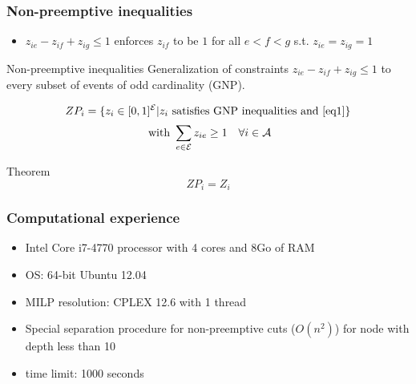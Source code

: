 \begin{frame}
  \frametitle{Non-preemptive inequalities}

  \begin{itemize}
  \item $ z_{ie}-z_{if}+z_{ig} \le 1$ enforces
    $z_{if}$ to be $1$ for all $e<f<g$ s.t. $z_{ie}=z_{ig}=1$ 
  \end{itemize}
  \pause
  \vspace{0.4cm}
  \begin{block}{Non-preemptive inequalities }
    Generalization of constraints $ z_{ie}-z_{if}+z_{ig} \le 1$ to
    every subset of events of odd cardinality (GNP).
  \end{block}
  \pause
  \vspace{0.4cm}
  \[ZP_i=\{ z_i \in [0,1]^{\cal E} | z_i\text{ satisfies
      GNP inequalities and } \eqref{eq1}\}\] 
  \begin{equation}
    \text{ with }  \sum_{e \in \cal E} z_{ie} \ge 1 \quad \forall i \in \cal A  
    \label{eq1}  
  \end{equation}
  \pause
  \vspace{0.4cm}
  \begin{block}{Theorem}
    \[ZP_i=Z_i\]
  \end{block}
  \vspace{0.5cm}
\end{frame}


\begin{frame}
  \frametitle{Computational experience}
  \begin{itemize}
    \vfill
  \item Intel Core i7-4770 processor with 4 cores and 8Go of RAM
    \vfill
  \item OS: 64-bit Ubuntu 12.04
    \vfill
  \item MILP resolution: CPLEX 12.6 with 1 thread  
    \vfill
  \item Special separation procedure for non-preemptive cuts ($O(n^2)$)
    for node with depth less than 10
    \vfill
  \item time limit: 1000 seconds
    \vfill
  \end{itemize}
\end{frame}

\mydata

